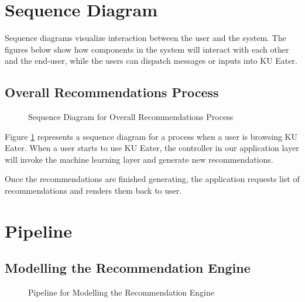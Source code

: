 \section{Sequence Diagram}
\label{section:sequence-diagram}

Sequence diagrams visualize interaction between the user and the system. The figures below show how components in the system will interact with
each other and the end-user, while the users can dispatch messages or inputs into KU Eater.

\subsection{Overall Recommendations Process}
\begin{figure}[h!]
    \centering
    
    \caption{Sequence Diagram for Overall Recommendations Process}
    \label{fig:seq-recommendation-process}
\end{figure}

Figure \ref{fig:seq-recommendation-process} represents a sequence diagram for a process when a user is browsing KU Eater. When a user
starts to use KU Eater, the controller in our application layer will invoke the machine learning layer and generate new recommendations.

Once the recommendations are finished generating, the application requests list of recommendations and renders them back to user.


\newpage

\section{Pipeline}
\label{section:pipeline}

\subsection{Modelling the Recommendation Engine}
\begin{figure}[h!]
    \centering
    
    \caption{Pipeline for Modelling the Recommendation Engine}
\end{figure}

